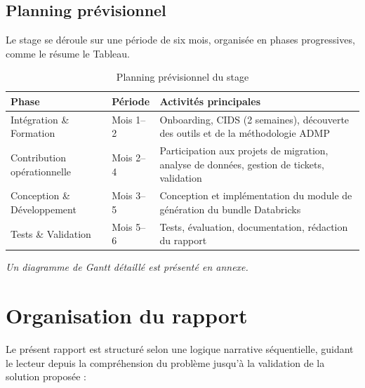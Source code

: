 \subsection{Planning prévisionnel}
\label{subsec:planning}

Le stage se déroule sur une période de six mois, organisée en phases progressives, comme le résume le Tableau.

\begin{table}[h!]
\centering
\caption{Planning prévisionnel du stage}
\label{tab:planning}
\begin{tabularx}{\textwidth}{l l X}
\toprule
\textbf{Phase} & \textbf{Période} & \textbf{Activités principales} \\
\midrule
Intégration \& Formation & Mois 1--2 & Onboarding, CIDS (2 semaines), découverte des outils et de la méthodologie ADMP \\
\addlinespace
Contribution opérationnelle & Mois 2--4 & Participation aux projets de migration, analyse de données, gestion de tickets, validation \\
\addlinespace
Conception \& Développement & Mois 3--5 & Conception et implémentation du module de génération du bundle Databricks \\
\addlinespace
Tests \& Validation & Mois 5--6 & Tests, évaluation, documentation, rédaction du rapport \\
\bottomrule
\end{tabularx}
\end{table}

\textit{Un diagramme de Gantt détaillé est présenté en annexe.}

\section{Organisation du rapport}
\label{sec:organisation}

Le présent rapport est structuré selon une logique narrative séquentielle, guidant le lecteur depuis la compréhension du problème jusqu'à la validation de la solution proposée :

